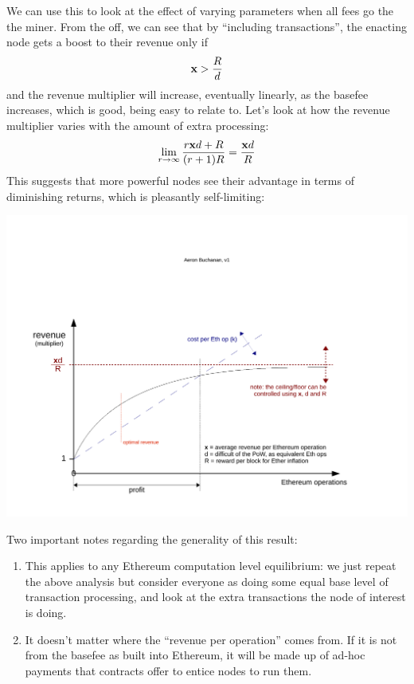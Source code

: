 \documentclass[10pt,a4paper]{article}
\begin{document}
We can use this to look at the effect of varying parameters when all fees go the the miner. From the off, we can see that by ``including transactions'', the enacting node gets a boost to their revenue only if 
\begin{align}
{\ensuremath{\mathbf x}} > \frac{R}{d}
\end{align}
and the revenue multiplier will increase, eventually linearly, as the basefee increases, which is good, being easy to relate to. Let's look at how the revenue multiplier varies with the amount of extra processing:
\begin{align}
\lim_{r\rightarrow\infty} \frac{r{\mathbf x} d + {R}}{(r+1){R}} = \frac{{\mathbf x} d}{{R}}
\end{align}
This suggests that more powerful nodes see their advantage in terms of diminishing returns, which is pleasantly self-limiting:

\begin{center}
\includegraphics[trim=1cm 1cm 1cm 6cm, clip, width=15cm]{Diagrams/CompPayoff.pdf}
\end{center}

Two important notes regarding the generality of this result:
\begin{enumerate} \itemsep=0pt
\item This applies to any Ethereum computation level equilibrium: we just repeat the above analysis but consider everyone as doing some equal base level of transaction processing, and look at the extra transactions the node of interest is doing.
\item It doesn't matter where the ``revenue per operation'' comes from. If it is not from the basefee as built into Ethereum, it will be made up of ad-hoc payments that contracts offer to entice nodes to run them.
\end{enumerate}
\end{document}
